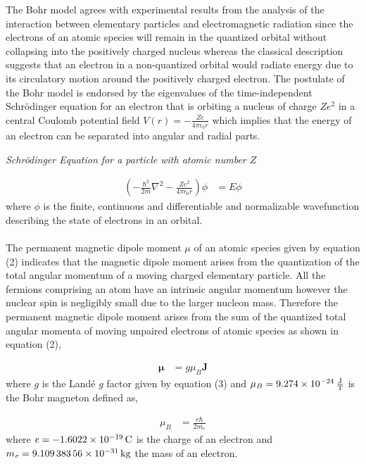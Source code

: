 \documentclass[a4paper,11pt]{article}
\begin{document}
The Bohr model agrees with experimental results from the analysis of the interaction between elementary particles and electromagnetic radiation since the electrons of an atomic species will remain in the quantized orbital without collapsing into the positively charged nucleus whereas the classical description suggests that an electron in a non-quantized orbital would radiate energy due to its circulatory motion around the positively charged electron\cite{coey2010}. The postulate of the Bohr model is endorsed by the eigenvalues of the time-independent Schr\"{o}dinger equation for an electron that is orbiting a nucleus of charge $Z\mathit{e^2}$ in a central Coulomb potential field $V(r) = -\frac{Z\mathit{e}}{4\pi\epsilon_{0}r}$ which implies that the energy of an electron can be separated into angular and radial parts\cite{Masina2018}.

\begin{center}
\textit{Schr\"{o}dinger Equation for a particle with atomic number $Z$}
\end{center}

\begin{align}
\left( -\frac{\hbar^2}{2m}\nabla^2 - \frac{Z\mathit{e^2}}{4\pi\epsilon_{0}r} \right)\phi	& = E\phi\nonumber
\end{align}
where $\phi$ is the finite, continuous and differentiable and normalizable wavefunction describing the state of electrons in an orbital.\\
\\ 
The permanent magnetic dipole moment $\mu$ of an atomic species given by equation (2) indicates that the magnetic dipole moment arises from the quantization of the total angular momentum of a moving charged elementary particle. All the fermions comprising an atom have an intrinsic angular momentum however the nuclear spin is negligibly small due to the larger nucleon mass\cite{coey2010}. Therefore the permanent magnetic dipole moment arises from the sum of the quantized total angular momenta of moving unpaired electrons of atomic species as shown in equation (2),

\begin{align}
\mathbf{\mu}	& = g \mu_B \mathbf{J}
\end{align}
where $g$ is the Land\'{e} $g$ factor given by equation (3) and $\mu_B = \SI{9.274d-24}{\joule\per\tesla}$ is the Bohr magneton defined as,

\begin{align}
\mu_B	& = \frac{\mathit{e}\hbar}{2m_\mathit{e}}\nonumber
\end{align}
where $\mathit{e} = \SI{-1.6022d-19}{\coulomb}$ is the charge of an electron and $m_\mathit{e} = \SI{9.10938356d-31}{\kilogram}$ the mass of an electron. 
\end{document}

